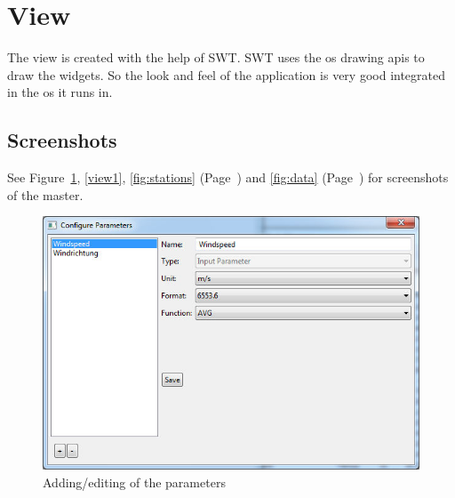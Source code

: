 
\section{View} %
\label{sec:view}

The view is created with the help of SWT. SWT uses the os drawing apis to draw the widgets. So the look and feel of the application is very good integrated in the os it runs in. 

\subsection{Screenshots} %
\label{sub:screenshots}
See Figure~\ref{fig:parameter}, \ref{view1}, \ref{fig:stations} (Page~\pageref{fig:stations}) and \ref{fig:data} (Page~\pageref{fig:data}) for screenshots of the master.

\begin{figure}[ht]
    \centering
    \includegraphics[width=0.8\linewidth]{master/parameters.jpg}
    \caption{Adding/editing of the parameters}
    \label{fig:parameter}
\end{figure} 

